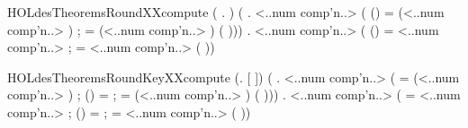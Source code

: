 \begin{SaveVerbatim}{HOLdesTheoremsRoundXXcompute}
\HOLTokenTurnstile{} (\HOLSymConst{\HOLTokenForall{}} .     \HOLSymConst{=} ) \HOLSymConst{\HOLTokenConj{}}
   (\HOLSymConst{\HOLTokenForall{}}  .
       <..num comp'n..>   \HOLSymConst{=}
      (
         (\HOLSymConst{,}) =  (<..num comp'n..> \HOLSymConst{\ensuremath{-}} )  ;
          =  (<..num comp'n..> \HOLSymConst{\ensuremath{-}} ) 
         (\HOLSymConst{,} \HOLSymConst{\HOLTokenEor{}}   ))) \HOLSymConst{\HOLTokenConj{}}
   \HOLSymConst{\HOLTokenForall{}}  .
      <..num comp'n..>   \HOLSymConst{=}
     (
        (\HOLSymConst{,}) =  <..num comp'n..>  ;
         =  <..num comp'n..> 
        (\HOLSymConst{,} \HOLSymConst{\HOLTokenEor{}}   ))
\end{SaveVerbatim}
\newcommand{\HOLdesTheoremsRoundXXcompute}{\UseVerbatim{HOLdesTheoremsRoundXXcompute}}
\begin{SaveVerbatim}{HOLdesTheoremsRoundKeyXXcompute}
\HOLTokenTurnstile{} (\HOLSymConst{\HOLTokenForall{}}.    \HOLSymConst{=} [ ]) \HOLSymConst{\HOLTokenConj{}}
   (\HOLSymConst{\HOLTokenForall{}} .
       <..num comp'n..>  \HOLSymConst{=}
      (
          =  (<..num comp'n..> \HOLSymConst{\ensuremath{-}} ) ;
         (\HOLSymConst{,}) =  ;
          =  (<..num comp'n..> \HOLSymConst{\ensuremath{-}} ) 
         ( \HOLSymConst{\HOLTokenRol{}} \HOLSymConst{,} \HOLSymConst{\HOLTokenRol{}} )\HOLSymConst{::})) \HOLSymConst{\HOLTokenConj{}}
   \HOLSymConst{\HOLTokenForall{}} .
      <..num comp'n..>  \HOLSymConst{=}
     (
         =  <..num comp'n..> ;
        (\HOLSymConst{,}) =  ;
         =  <..num comp'n..> 
        ( \HOLSymConst{\HOLTokenRol{}} \HOLSymConst{,} \HOLSymConst{\HOLTokenRol{}} )\HOLSymConst{::})
\end{SaveVerbatim}
